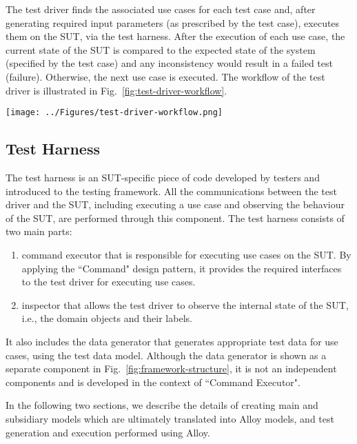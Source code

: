 The test driver finds the associated use cases for each test case and, after generating required input parameters (as prescribed by the test case), executes them on the SUT, via the test harness. After the execution of each use case, the current state of the SUT is compared to the expected state of the system (specified by the test case) and any inconsistency would result in a failed test (failure). Otherwise, the next use case is executed.  The workflow of the test driver is illustrated in Fig.~\ref{fig:test-driver-workflow}.

\begin{figure*}[!t]
\centering
\texttt{[image: ../Figures/test-driver-workflow.png]}
\caption{The workflow of the test driver.}
\label{fig:test-driver-workflow}
\end{figure*}

\subsection{Test Harness}
\label{sec:framework-overview-test-harness}
The test harness is an SUT-specific piece of code developed by testers and introduced to the testing framework. All the communications between the test driver and the SUT, including executing a use case and observing the behaviour of the SUT, are performed through this component. The test harness consists of two main parts: 
\begin{enumerate}
	\item command executor that is responsible for executing use cases on the SUT. By applying the ``Command" design pattern, it provides the required interfaces to the test driver for executing use cases. 
	
	\item inspector that allows the test driver to observe the internal state of the SUT, i.e., the domain objects and their labels.
\end{enumerate}

It also includes the data generator that generates appropriate test data for use cases, using the test data model. Although the data generator is shown as a separate component in Fig.~\ref{fig:framework-structure}, it is not an independent components and is developed in the context of ``Command Executor". 

In the following two sections, we describe the details of creating main and subsidiary models which are ultimately translated into Alloy models, and test generation and execution performed using Alloy.